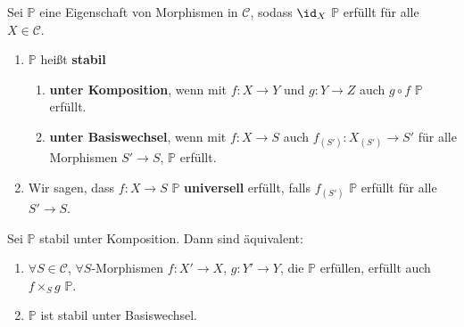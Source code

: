 \begin{defn}[16]
  Sei $\mathbb{P}$ eine Eigenschaft von Morphismen in $\mathcal{C}$,
  sodass $\id_{X}$ $\mathbb{P}$ erfüllt für alle $X\in\mathcal{C}$.
  \begin{enumerate}
  \item $\mathbb{P}$ heißt \textbf{stabil}
    \begin{enumerate}
    \item \textbf{unter Komposition}, wenn mit $f:X\rightarrow Y$ und $g:Y\rightarrow Z$
      auch $g\circ f$ $\mathbb{P}$ erfüllt.
    \item \textbf{unter Basiswechsel}, wenn mit $f:X\rightarrow S$ auch $f_{(S')}:X_{(S')}\rightarrow S'$
      für alle Morphismen $S'\rightarrow S$, $\mathbb{P}$ erfüllt.
    \end{enumerate}
  \item Wir sagen, dass $f:X\rightarrow S$ $\mathbb{P}$ \textbf{universell}
    erfüllt, falls $f_{(S')}$ $\mathbb{P}$ erfüllt für alle $S'\rightarrow S$.
  \end{enumerate}
\end{defn}

\begin{rem}[17]
  Sei $\mathbb{P}$ stabil unter Komposition. Dann sind äquivalent:
  \begin{enumerate}
  \item $\forall S\in\mathcal{C}$, $\forall S$-Morphismen $f:X'\rightarrow X$,
    $g:Y'\rightarrow Y$, die $\mathbb{P}$ erfüllen, erfüllt auch $f\times_{S}g$
    $\mathbb{P}$.
  \item $\mathbb{P}$ ist stabil unter Basiswechsel.
  \end{enumerate}
\end{rem}

